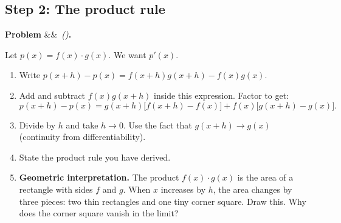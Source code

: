 \documentclass[12pt, a4paper]{article}
\newcounter{problem}
\newenvironment{problem}[1][]{%
  \refstepcounter{problem}%
  \par\vspace{6pt}%
  \noindent\textbf{\color{MidBlue}Problem \theproblem}%
  \ifx&#1&\else\ \textit{(#1)}\fi\textbf{.}\enskip
}{\par\vspace{4pt}}
\begin{document}
\subsection{Step 2: The product rule}

\begin{problem}
\label{prob:product_rule_derive}
Let $p(x) = f(x) \cdot g(x)$. We want $p'(x)$.

\begin{enumerate}[label=(\alph*), topsep=2pt]
  \item Write $p(x+h) - p(x) = f(x+h)g(x+h) - f(x)g(x)$.
  \item Add and subtract $f(x)g(x+h)$ inside this expression. Factor to get:
  \[
    p(x+h) - p(x) = g(x+h)\bigl[f(x+h) - f(x)\bigr] + f(x)\bigl[g(x+h) - g(x)\bigr].
  \]
  \item Divide by $h$ and take $h \to 0$. Use the fact that $g(x+h) \to g(x)$ (continuity from differentiability).
  \item State the product rule you have derived.
  \item \textbf{Geometric interpretation.} The product $f(x) \cdot g(x)$ is the area of a rectangle with sides $f$ and $g$. When $x$ increases by $h$, the area changes by three pieces: two thin rectangles and one tiny corner square. Draw this. Why does the corner square vanish in the limit?
\end{enumerate}
\end{problem}

\begin{center}
\end{center}
\end{document}

